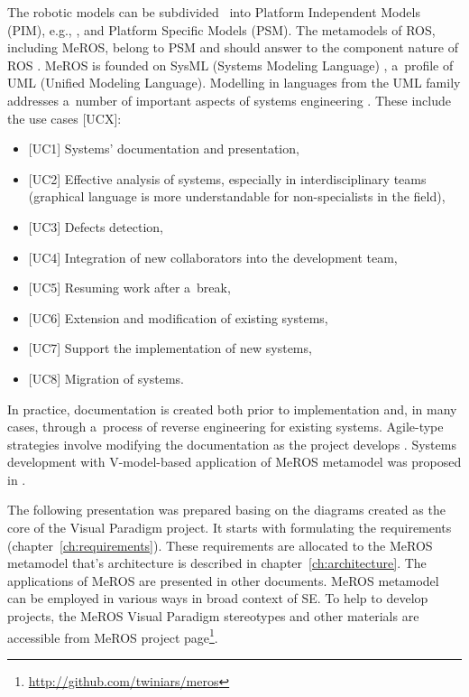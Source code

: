 \documentclass[11pt,oneside,a4paper]{report}
\begin{document}
	The robotic models can be subdivided~\cite{de2021survey} into Platform Independent Models (PIM), e.g., \cite{tasker2020,earl2020,zielinski2010motion,zielinski2017variable}, and Platform Specific Models (PSM). The metamodels of ROS, including MeROS, belong to PSM and should answer to the component nature of ROS \cite{Figat:2022:RAS,wenger2016model}.
	 MeROS is founded on SysML (Systems Modeling Language) \cite{Friedenthal:2015,omg-sysml17}, a~profile of UML (Unified Modeling Language). Modelling in languages from the UML family addresses a~number of important aspects of systems engineering \cite{chaudron2012effective}. These include the use cases [UCX]:
	\begin{itemize}
		\item $[$UC1] Systems' documentation and presentation,
		\item $[$UC2] Effective analysis of systems, especially in interdisciplinary teams (graphical language is more understandable for non-specialists in the field), 
		\item $[$UC3] Defects detection,
		\item $[$UC4] Integration of new collaborators into the development team,
		\item $[$UC5] Resuming work after a~break,
		\item $[$UC6] Extension and modification of existing systems,
		\item $[$UC7] Support the implementation of new systems,
		\item $[$UC8] Migration of systems.
	\end{itemize}
	
	In practice, documentation is created both prior to implementation and, in many cases, through a~process of reverse  engineering \cite{canfora2007new} for existing systems. Agile-type strategies involve modifying the documentation as the project develops \cite{habib2021systematic}. Systems development with V-model-based application of MeROS metamodel was proposed in \cite{winiarski2025-v-model}.
			
	The following presentation was prepared basing on the diagrams created as the core of the Visual Paradigm project. It starts with formulating the requirements (chapter~\ref{ch:requirements}). These requirements are allocated to the MeROS metamodel that's architecture is described in chapter~\ref{ch:architecture}. The applications of MeROS are presented in other documents.
	MeROS metamodel can be employed in various ways in broad context of SE. To help to develop projects, the MeROS Visual Paradigm stereotypes and other materials are accessible from MeROS project page\footnote{\url{http://github.com/twiniars/meros}}. 
	
\end{document}
